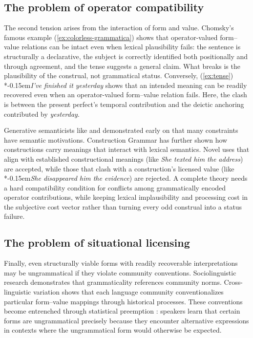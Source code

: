\documentclass[12pt,letterpaper]{article}
\newcommand{\mention}[1]{\textit{#1}}
\newcommand{\judgesep}{\kern-0.15em}
\newcommand{\ungram}[1]{*\judgesep#1}
\begin{document}
\subsection{The problem of operator compatibility}\label{sec:impasse-coherence}

The second tension arises from the interaction of form and value. Chomsky's famous example (\ref{ex:colorless-grammatica}) shows that operator-valued form--value relations can be intact even when lexical plausibility fails: the sentence is structurally a declarative, the subject is correctly identified both positionally and through agreement, and the tense suggests a general claim. What breaks is the plausibility of the construal, not grammatical status. Conversely, (\ref{ex:tense}) \ungram{\mention{I've finished it yesterday}} shows that an intended meaning can be readily recovered even when an operator-valued form--value relation fails. Here, the clash is between the present perfect's temporal contribution and the deictic anchoring contributed by \mention{yesterday}.

Generative semanticists like \textcite{lakoff1971} and \textcite{mccawley1968} demonstrated early on that many constraints have semantic motivations. Construction Grammar \autocite{goldberg1995constructions} has further shown how constructions carry meanings that interact with lexical semantics. Novel uses that align with established constructional meanings (like \mention{She texted him the address}) are accepted, while those that clash with a construction's licensed value (like \ungram{\mention{She disappeared him the evidence}}) are rejected. A complete theory needs a hard compatibility condition for conflicts among grammatically encoded operator contributions, while keeping lexical implausibility and processing cost in the subjective cost vector rather than turning every odd construal into a status failure.

\subsection{The problem of situational licensing}\label{sec:impasse-licensing}

Finally, even structurally viable forms with readily recoverable interpretations may be ungrammatical if they violate community conventions. Sociolinguistic research \autocite{labov1972} demonstrates that grammaticality references community norms. Cross-linguistic variation shows that each language community conventionalizes particular form--value mappings through historical processes. These conventions become entrenched through statistical preemption \autocite{Goldberg2011}: speakers learn that certain forms are ungrammatical precisely because they encounter alternative expressions in contexts where the ungrammatical form would otherwise be expected.
\end{document}
